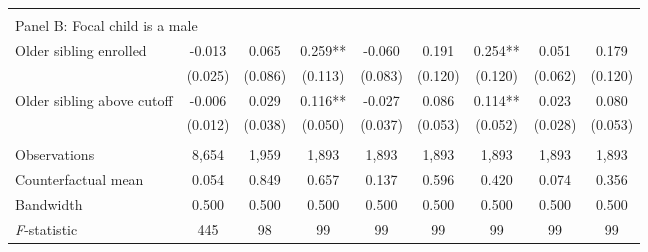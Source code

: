 {{\begin{tabular}{lcccccccc}
&  &  &  & & & & & \\
\multicolumn{10}{l}{Panel B: Focal child is a male} \\
Older sibling enrolled&      -0.013   &       0.065   &       0.259** &      -0.060   &       0.191   &       0.254** &       0.051   &       0.179   \\
                    &     (0.025)   &     (0.086)   &     (0.113)   &     (0.083)   &     (0.120)   &     (0.120)   &     (0.062)   &     (0.120)   \\
 
Older sibling above cutoff&      -0.006   &       0.029   &       0.116** &      -0.027   &       0.086   &       0.114** &       0.023   &       0.080   \\
                    &     (0.012)   &     (0.038)   &     (0.050)   &     (0.037)   &     (0.053)   &     (0.052)   &     (0.028)   &     (0.053)   \\
                    &               &               &               &               &               &               &               &               \\
Observations        &       8,654   &       1,959   &       1,893   &       1,893   &       1,893   &       1,893   &       1,893   &       1,893   \\
Counterfactual mean &       0.054   &       0.849   &       0.657   &       0.137   &       0.596   &       0.420   &       0.074   &       0.356   \\
Bandwidth           &       0.500   &       0.500   &       0.500   &       0.500   &       0.500   &       0.500   &       0.500   &       0.500   \\
\textit{F}-statistic&         445   &          98   &          99   &          99   &          99   &          99   &          99   &          99   \\
 

\bottomrule
\end{tabular}
}
}
